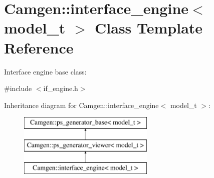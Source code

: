 \hypertarget{a00318}{}\section{Camgen\+:\+:interface\+\_\+engine$<$ model\+\_\+t $>$ Class Template Reference}
\label{a00318}


Interface engine base class\+:  




{\ttfamily \#include $<$if\+\_\+engine.\+h$>$}

Inheritance diagram for Camgen\+:\+:interface\+\_\+engine$<$ model\+\_\+t $>$\+:\begin{figure}[H]
\begin{center}
\leavevmode
\includegraphics[height=3.000000cm]{a00318}
\end{center}
\end{figure}

